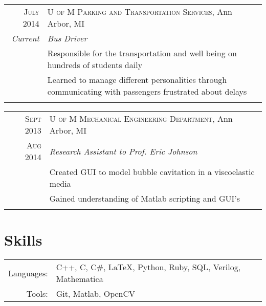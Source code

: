 \documentclass[a4paper,10pt]{article} %
\begin{document}
\begin{tabular}{r|p{13cm}}
\textsc{July 2014} & \textsc{U of M Parking and Transportation Services}, Ann Arbor, MI\\
\emph{Current} & \emph{Bus Driver} \\
& \footnotesize{Responsible for the transportation and well being on hundreds
  of students daily} \\
& \footnotesize{Learned to manage different personalities through communicating
  with passengers frustrated about delays} \\
\multicolumn{2}{c}{} \\
\end{tabular}


\begin{tabular}{r|p{13cm}}
\textsc{Sept 2013} & \textsc{U of M Mechanical Engineering Department}, Ann Arbor, MI \\
\textsc{Aug 2014} & \emph{Research Assistant to Prof. Eric Johnson} \\
& \footnotesize{Created GUI to model bubble cavitation in a viscoelastic media} \\
& \footnotesize{Gained understanding of Matlab scripting and GUI's} \\
\multicolumn{2}{c}{} \\
\end{tabular}



\section{Skills}

\begin{tabular}{rl}
Languages: & C++, C, C\#, \LaTeX, Python, Ruby, SQL, Verilog, Mathematica \\
Tools: & Git, Matlab, OpenCV
\end{tabular}

\clearpage %
\end{document}

